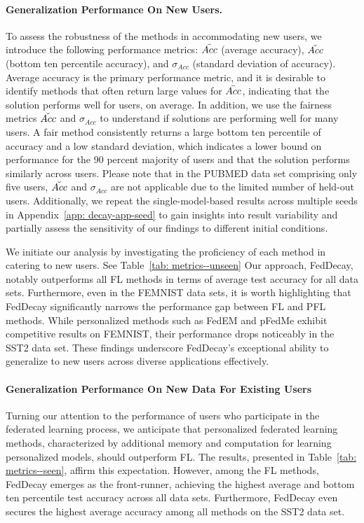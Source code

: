 \paragraph{Generalization Performance On New Users.}
To assess the robustness of the methods in accommodating new users, we introduce the following performance metrics: $\Bar{Acc}$ (average accuracy), $\Breve{Acc}$ (bottom ten percentile accuracy), and $\sigma_{Acc}$ (standard deviation of accuracy). 
Average accuracy is the primary performance metric, and it is desirable to identify methods that often return large values for $\Bar{Acc}$, indicating that the solution performs well for users, on average.
In addition, we use the fairness metrics $\Breve{Acc}$ and $\sigma_{Acc}$ to understand if solutions are performing well for many users.
A fair method consistently returns a large bottom ten percentile of accuracy and a low standard deviation, which indicates a lower bound on performance for the 90 percent majority of users and that the solution performs similarly across users.
Please note that in the PUBMED data set comprising only five users, $\Breve{Acc}$ and $\sigma_{Acc}$ are not applicable due to the limited number of held-out users.
Additionally, we repeat the single-model-based results across multiple seeds in Appendix~\ref{app: decay-app-seed} to gain insights into result variability and partially assess the sensitivity of our findings to different initial conditions.

We initiate our analysis by investigating the proficiency of each method in catering to new users.
See Table~\ref{tab: metrics--unseen}
Our approach, FedDecay, notably outperforms all FL methods in terms of average test accuracy for all data sets.
Furthermore, even in the FEMNIST data sets, it is worth highlighting that FedDecay significantly narrows the performance gap between FL and PFL methods.
While personalized methods such as FedEM and pFedMe exhibit competitive results on FEMNIST, their performance drops noticeably in the SST2 data set. These findings underscore FedDecay's exceptional ability to generalize to new users across diverse applications effectively.


\paragraph{Generalization Performance On New Data For Existing Users}
Turning our attention to the performance of users who participate in the federated learning process, we anticipate that personalized federated learning methods, characterized by additional memory and computation for learning personalized models, should outperform FL.
The results, presented in Table~\ref{tab: metrics--seen}, affirm this expectation.
However, among the FL methods, FedDecay emerges as the front-runner, achieving the highest average and bottom ten percentile test accuracy across all data sets.
Furthermore, FedDecay even secures the highest average accuracy among all methods on the SST2 data set.

